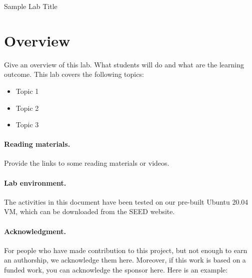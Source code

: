 




\begin{center}
{\LARGE Sample Lab Title}
\end{center}

\vspace{0.1in}
\vspace{0.1in}



\section{Overview}

Give an overview of this lab. What students will do and what 
are the learning outcome. This lab covers the following topics:
\begin{itemize}[noitemsep]
\item Topic 1
\item Topic 2
\item Topic 3
\end{itemize}


\paragraph{Reading materials.}
Provide the links to some reading materials or videos. 



\paragraph{Lab environment.} The activities in this document 
have been tested on our pre-built
Ubuntu 20.04 VM, which can be downloaded from the SEED website.  


\paragraph{Acknowledgment.} 
For people who have made contribution to this project, but 
not enough to earn an authorship, we acknowledge them here. 
Moreover, if this work is based on a funded work, you can
acknowledge the sponsor here. Here is an example:

